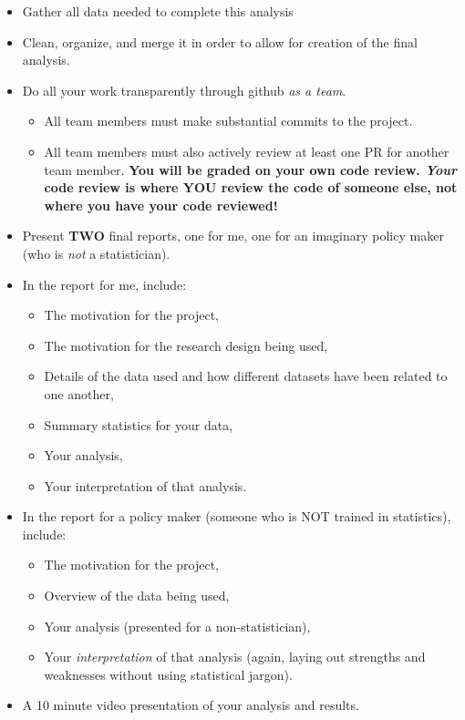 \documentclass[12pt]{article}
\begin{document}
\begin{itemize}
  \item Gather all data needed to complete this analysis
  \item Clean, organize, and merge it in order to allow for creation of the final analysis.
  \item Do all your work transparently through github \emph{as a team}.
  \begin{itemize}
    \item All team members must make substantial commits to the project.
    \item All team members must also actively review at least one PR for another team member. \textbf{You will be graded on your own code review. \emph{Your} code review is where YOU review the code of someone else, not where you have your code reviewed!}
  \end{itemize}
  \item Present \textbf{TWO} final reports, one for me, one for an imaginary policy maker (who is \emph{not} a statistician).
  \item In the report for me, include:
  \begin{itemize}
    \item The motivation for the project,
    \item The motivation for the research design being used,
    \item Details of the data used and how different datasets have been related to one another,
    \item Summary statistics for your data,
    \item Your analysis,
    \item Your interpretation of that analysis.
  \end{itemize}
  \item In the report for a policy maker (someone who is NOT trained in statistics), include:
  \begin{itemize}
    \item The motivation for the project,
    \item Overview of the data being used,
    \item Your analysis (presented for a non-statistician),
    \item Your \emph{interpretation} of that analysis (again, laying out strengths and weaknesses without using statistical jargon).
  \end{itemize}
  \item A 10 minute video presentation of your analysis and results.
\end{itemize}
\end{document}
